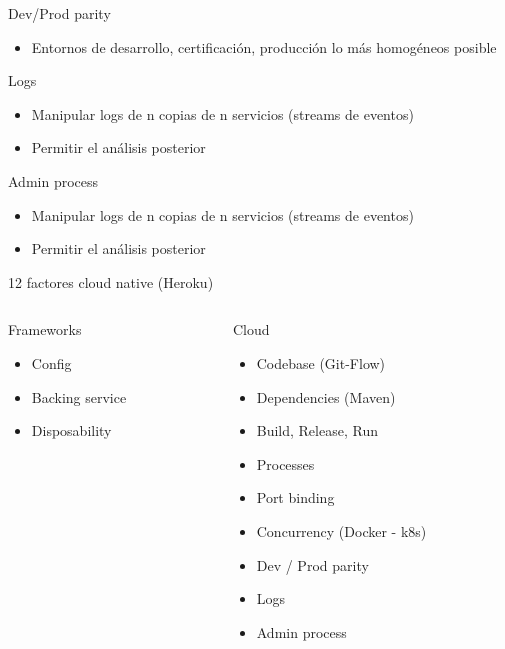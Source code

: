 \documentclass{beamer}
\begin{document}
\begin{frame}{Dev/Prod parity}
\begin{itemize}
	\item Entornos de desarrollo, certificación, producción lo más homogéneos posible
\end{itemize}
\end{frame}

\begin{frame}{Logs}
\begin{itemize}
	\item Manipular logs de n copias de n servicios (streams de eventos)
	\item Permitir el análisis posterior
\end{itemize}
\end{frame}

\begin{frame}{Admin process}
\begin{itemize}
	\item Manipular logs de n copias de n servicios (streams de eventos)
	\item Permitir el análisis posterior
\end{itemize}
\end{frame}


\begin{frame}{12 factores cloud native (Heroku)}

\begin{columns}[T] %
	
	\begin{column}[T]{4cm} %
		\begin{alertblock}{Frameworks}
			\begin{itemize}
				\item Config
				\item Backing service
				\item Disposability
			\end{itemize}
		\end{alertblock}
	\end{column}
	\begin{column}[T]{6cm} %
		\begin{block}{Cloud}
			\begin{itemize}
				\item Codebase (Git-Flow)
				\item Dependencies (Maven)
				\item Build, Release, Run
				\item Processes
				\item Port binding
				\item Concurrency (Docker - k8s)
				\item Dev / Prod parity
				\item Logs
				\item Admin process
			\end{itemize}
		\end{block}
	\end{column}
\end{columns}

\end{frame}
\end{document}
